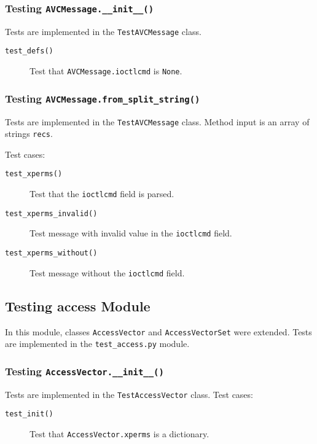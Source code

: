 \subsubsection{Testing \texttt{AVCMessage.\_\_init\_\_()}}
Tests are implemented in the \texttt{TestAVCMessage} class.

\begin{description}
    \item [\texttt{test\_defs()}] Test that \texttt{AVCMessage.ioctlcmd} is
        \texttt{None}.
\end{description}

\subsubsection{Testing \texttt{AVCMessage.from\_split\_string()}}
Tests are implemented in the \texttt{TestAVCMessage} class. Method input is an
array of strings \texttt{recs}.

Test cases:
\begin{description}
    \item [\texttt{test\_xperms()}] Test that the \texttt{ioctlcmd} field is
        parsed.
    \item [\texttt{test\_xperms\_invalid()}] Test message with invalid value in
        the \texttt{ioctlcmd} field.
    \item [\texttt{test\_xperms\_without()}] Test message without the
        \texttt{ioctlcmd} field.
\end{description}

\subsection{Testing access Module}
In this module, classes \texttt{AccessVector} and \texttt{AccessVectorSet} were
extended. Tests are implemented in the \texttt{test\_access.py} module.

\subsubsection{Testing \texttt{AccessVector.\_\_init\_\_()}}
Tests are implemented in the \texttt{TestAccessVector} class. Test cases:

\begin{description}
    \item [\texttt{test\_init()}] Test that
        \texttt{AccessVector.xperms} is a dictionary.
\end{description}

